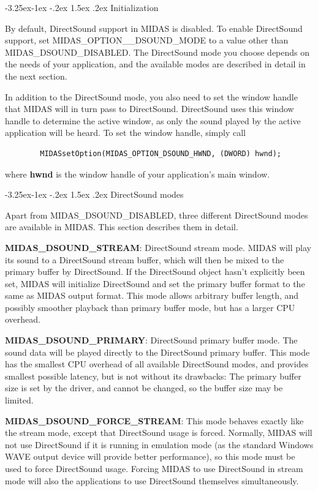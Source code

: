 \documentclass[a4paper,12pt,oneside]{book}
\makeatletter
\renewcommand\subsection{\@startsection{subsection}{2}{-20pt}%
                                     {-3.25ex\@plus -1ex \@minus -.2ex}%
                                     {1.5ex \@plus .2ex}%
                                     {\normalfont\large\bfseries}}
\newcommand{\mVariable}[1]{{\bf #1}}
\makeatother
\begin{document}
\subsection{Initialization}

By default, DirectSound support in MIDAS is disabled. To enable DirectSound
support, set MIDAS\_{}OPTION\_{}\_DSOUND\_{}MODE to a value other than
MIDAS\_{}DSOUND\_{}DISABLED. The DirectSound mode you choose depends on the
needs of your application, and the available modes are described in detail in
the next section.

In addition to the DirectSound mode, you also need to set the window handle
that MIDAS will in turn pass to DirectSound. DirectSound uses this window
handle to determine the active window, as only the sound played by the active
application will be heard. To set the window handle, simply call
\begin{verbatim}
        MIDASsetOption(MIDAS_OPTION_DSOUND_HWND, (DWORD) hwnd);
\end{verbatim}
where \mVariable{hwnd} is the window handle of your application's main
window.


\subsection{DirectSound modes}

Apart from MIDAS\_{}DSOUND\_{}DISABLED, three different DirectSound modes are
available in MIDAS. This section describes them in detail.

{\bf MIDAS\_{}DSOUND\_{}STREAM}: DirectSound stream mode. MIDAS will play its
sound to a DirectSound stream buffer, which will then be mixed to the primary
buffer by DirectSound. If the DirectSound object hasn't explicitly been set,
MIDAS will initialize DirectSound and set the primary buffer format to the
same as MIDAS output format. This mode allows arbitrary buffer length, and
possibly smoother playback than primary buffer mode, but has a larger CPU
overhead.

{\bf MIDAS\_{}DSOUND\_{}PRIMARY}: DirectSound primary buffer mode. The sound
data will be played directly to the DirectSound primary buffer. This mode has
the smallest CPU overhead of all available DirectSound modes, and provides
smallest possible latency, but is not without its drawbacks: The primary
buffer size is set by the driver, and cannot be changed, so the buffer size
may be limited.

{\bf MIDAS\_{}DSOUND\_{}FORCE\_{}STREAM}: This mode behaves exactly like the
stream mode, except that DirectSound usage is forced. Normally, MIDAS will
not use DirectSound if it is running in emulation mode (as the standard
Windows WAVE output device will provide better performance), so this mode
must be used to force DirectSound usage. Forcing MIDAS to use DirectSound in
stream mode will also the applications to use DirectSound themselves
simultaneously.
\end{document}
